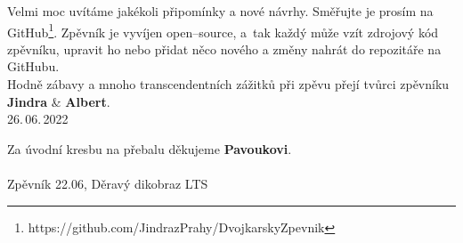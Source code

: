 \noindent
Velmi moc uvítáme jakékoli připomínky a nové návrhy.
Směřujte je prosím na GitHub\footnote{https://github.com/JindrazPrahy/DvojkarskyZpevnik}. %
Zpěvník je vyvíjen open--source, a~tak každý může vzít zdrojový kód zpěvníku,
upravit ho nebo přidat něco nového a změny nahrát do repozitáře na GitHubu.\\

\noindent
Hodně zábavy a mnoho transcendentních zážitků při zpěvu přejí tvůrci zpěvníku\\
\textbf{Jindra} \& \textbf{Albert}.\\
26.\,06.\,2022

\vspace*{.75cm}

\noindent
Za úvodní kresbu na přebalu děkujeme \textbf{Pavoukovi}.\\\\

\noindent
{\tiny \rmfamily Zpěvník 22.06, Děravý dikobraz LTS}
